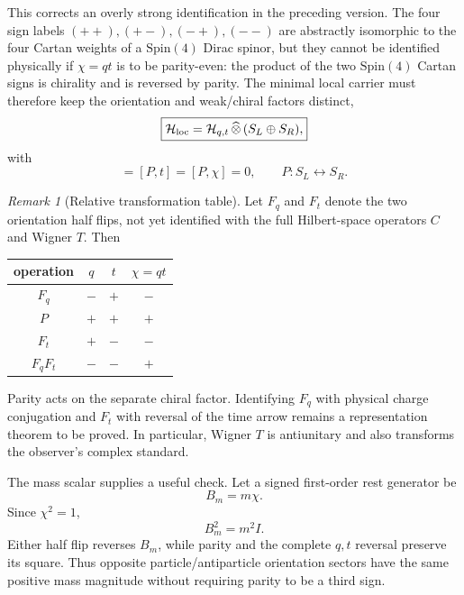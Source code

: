 \documentclass[11pt]{article}
\theoremstyle{definition}\newtheorem{definition}[theorem]{Definition}
\theoremstyle{remark}\newtheorem{remark}[theorem]{Remark}\newtheorem{conjecture}[theorem]{Conjecture}
\begin{document}
This corrects an overly strong identification in the preceding version. The four sign labels $(++),(+-),(-+),(--)$ are abstractly isomorphic to the four Cartan weights of a $\mathrm{Spin}(4)$ Dirac spinor, but they cannot be identified physically if $\chi=qt$ is to be parity-even: the product of the two $\mathrm{Spin}(4)$ Cartan signs is chirality and is reversed by parity. The minimal local carrier must therefore keep the orientation and weak/chiral factors distinct,
\begin{equation}\label{eq:localproductcarrier}
 \boxed{\mathcal H_{\rm loc}=\mathcal H_{q,t}\,\widehat\otimes\,(S_L\oplus S_R),}
\end{equation}
with
\begin{equation}
 [P,q]=[P,t]=[P,\chi]=0,
 \qquad
 P:S_L\leftrightarrow S_R.
\end{equation}

\begin{remark}[Relative transformation table]\label{rem:relativeoperationtable}
Let $F_q$ and $F_t$ denote the two orientation half flips, not yet identified with the full Hilbert-space operators $C$ and Wigner $T$. Then
\begin{center}
\begin{tabular}{c|ccc}
operation & $q$ & $t$ & $\chi=qt$\\
\hline
$F_q$ & $-$ & $+$ & $-$\\
$P$ & $+$ & $+$ & $+$\\
$F_t$ & $+$ & $-$ & $-$\\
$F_qF_t$ & $-$ & $-$ & $+$
\end{tabular}
\end{center}
Parity acts on the separate chiral factor. Identifying $F_q$ with physical charge conjugation and $F_t$ with reversal of the time arrow remains a representation theorem to be proved. In particular, Wigner $T$ is antiunitary and also transforms the observer's complex standard.
\end{remark}

The mass scalar supplies a useful check. Let a signed first-order rest generator be
\begin{equation}\label{eq:Bmchi}
 B_m=m\chi.
\end{equation}
Since $\chi^2=1$,
\begin{equation}\label{eq:Bmsquare}
 \boxed{B_m^2=m^2I.}
\end{equation}
Either half flip reverses $B_m$, while parity and the complete $q,t$ reversal preserve its square. Thus opposite particle/antiparticle orientation sectors have the same positive mass magnitude without requiring parity to be a third sign.
\end{document}
